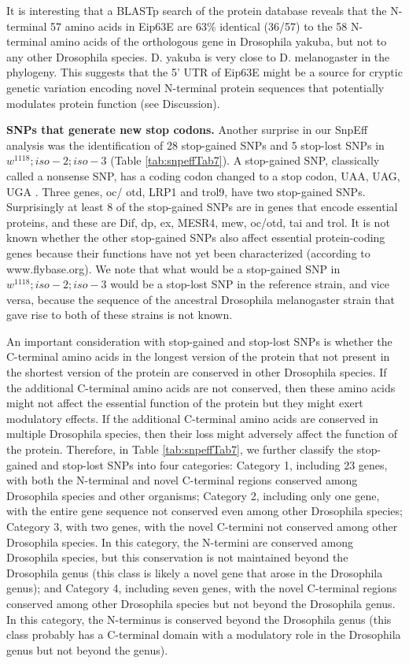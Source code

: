 It is interesting that a BLASTp search of the protein database reveals that the N-terminal 57 amino acids in Eip63E are 63\% identical (36/57) to the 58 N-terminal amino acids of the orthologous gene in Drosophila yakuba, but not to any other Drosophila species. D. yakuba is very close to D. melanogaster in the phylogeny. This suggests that the 5' UTR of Eip63E might be a source for cryptic genetic variation encoding novel N-terminal protein sequences that potentially modulates protein function (see Discussion).

\textbf{SNPs that generate new stop codons.} Another surprise in our SnpEff analysis was the identification of 28 stop-gained SNPs and 5 stop-lost SNPs in $w^{1118} ; iso-2; iso-3$ (Table \ref{tab:snpeffTab7}). A stop-gained SNP, classically called a nonsense SNP, has a coding codon changed to a stop codon, UAA, UAG, UGA \cite{brenner1965genetic}. Three genes, oc/ otd, LRP1 and trol9, have two stop-gained SNPs. Surprisingly at least 8 of the stop-gained SNPs are in genes that encode essential proteins, and these are Dif, dp, ex, MESR4, mew, oc/otd, tai and trol. It is not known whether the other stop-gained SNPs also affect essential protein-coding genes because their functions have not yet been characterized (according to www.flybase.org). We note that what would be a stop-gained SNP in $w^{1118} ; iso-2; iso-3$ would be a stop-lost SNP in the reference strain, and vice versa, because the sequence of the ancestral Drosophila melanogaster strain that gave rise to both of these strains is not known.

An important consideration with stop-gained and stop-lost SNPs is whether the C-terminal amino acids in the longest version of the protein that not present in the shortest version of the protein are conserved in other Drosophila species. If the additional C-terminal amino acids are not conserved, then these amino acids might not affect the essential function of the protein but they might exert modulatory effects. If the additional C-terminal amino acids are conserved in multiple Drosophila species, then their loss might adversely affect the function of the protein. Therefore, in Table \ref{tab:snpeffTab7}, we further classify the stop-gained and stop-lost SNPs into four categories: Category 1, including 23 genes, with both the N-terminal and novel C-terminal regions conserved among Drosophila species and other organisms; Category 2, including only one gene, with the entire gene sequence not conserved even among other Drosophila species; Category 3, with two genes, with the novel C-termini not conserved among other Drosophila species. In this category, the N-termini are conserved among Drosophila species, but this conservation is not maintained beyond the Drosophila genus (this class is likely a novel gene that arose in the Drosophila genus); and Category 4, including seven genes, with the novel C-terminal regions conserved among other Drosophila species but not beyond the Drosophila genus. In this category, the N-terminus is conserved beyond the Drosophila genus (this class probably has a C-terminal domain with a modulatory role in the Drosophila genus but not beyond the genus).


